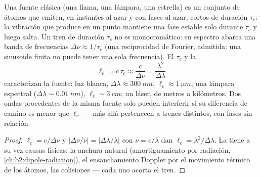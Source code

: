 \begin{proposition}\label{prop:b2:scalar-light-model:coherence}
Una fuente clásica (una llama, una lámpara, una estrella) es un conjunto de átomos
que emiten, en instantes al azar y con fases al azar, \emph{} cortos de duración $\tau_c$: la vibración que produce en un
punto mantiene una fase estable solo durante $\tau_c$ y luego salta. Un tren de
duración $\tau_c$ no es monocromático: su espectro abarca una banda de
frecuencias $\Delta\nu \approx 1/\tau_c$ (una reciprocidad de Fourier, admitida: una
sinusoide finita no puede tener una sola frecuencia). El \emph{}
$\tau_c$ y la \emph{}
\[
\ell_c = c\,\tau_c \approx \frac c{\Delta\nu} = \frac{\lambda^2}{\Delta\lambda}
\]
caracterizan la fuente: luz blanca, $\Delta\lambda \approx \qty{300}{nm}$, $\ell_c
\approx \qty{1}{\micro m}$; una lámpara espectral ($\Delta\lambda \sim \qty{0.01}{nm}$), $\ell_c \sim
\qty{3}{cm}$; un láser, de metros a kilómetros. Dos ondas procedentes de la
misma fuente solo pueden interferir si su diferencia de camino es menor
que $\ell_c$ --- más allá pertenecen a trenes distintos, con
fases sin relación.
\end{proposition}

\begin{proof}
$\ell_c = c/\Delta\nu$ y $|\Delta\nu/\nu| = |\Delta\lambda/\lambda|$ con $\nu = c/\lambda$ dan $\ell_c =
\lambda^2/\Delta\lambda$. La  tiene a su vez causas físicas: la
anchura natural (amortiguamiento por radiación, \cref{ch:b2:dipole-radiation}), el
ensanchamiento Doppler por el movimiento térmico de los átomos, las colisiones --- cada uno
acorta el tren.
\end{proof}

